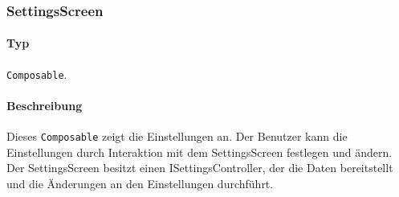 \subsubsection{SettingsScreen}
\paragraph*{Typ}
\texttt{Composable}.
\paragraph*{Beschreibung}
Dieses \texttt{Composable} zeigt die Einstellungen an. 
Der Benutzer kann die Einstellungen durch Interaktion mit dem SettingsScreen festlegen und ändern.\\
Der SettingsScreen besitzt einen ISettingsController, der die Daten bereitstellt und die Änderungen an den Einstellungen durchführt. 

